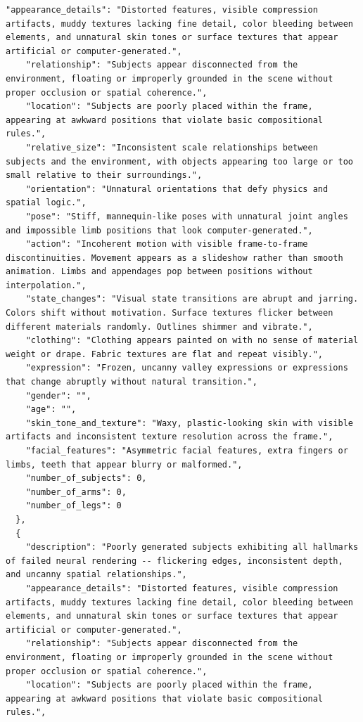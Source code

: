 \documentclass{llmxive}
\begin{document}
\begin{tcolorbox}
\begin{Verbatim}[breaklines=true,breakanywhere=true,fontsize=\scriptsize]
    "appearance_details": "Distorted features, visible compression artifacts, muddy textures lacking fine detail, color bleeding between elements, and unnatural skin tones or surface textures that appear artificial or computer-generated.",
    "relationship": "Subjects appear disconnected from the environment, floating or improperly grounded in the scene without proper occlusion or spatial coherence.",
    "location": "Subjects are poorly placed within the frame, appearing at awkward positions that violate basic compositional rules.",
    "relative_size": "Inconsistent scale relationships between subjects and the environment, with objects appearing too large or too small relative to their surroundings.",
    "orientation": "Unnatural orientations that defy physics and spatial logic.",
    "pose": "Stiff, mannequin-like poses with unnatural joint angles and impossible limb positions that look computer-generated.",
    "action": "Incoherent motion with visible frame-to-frame discontinuities. Movement appears as a slideshow rather than smooth animation. Limbs and appendages pop between positions without interpolation.",
    "state_changes": "Visual state transitions are abrupt and jarring. Colors shift without motivation. Surface textures flicker between different materials randomly. Outlines shimmer and vibrate.",
    "clothing": "Clothing appears painted on with no sense of material weight or drape. Fabric textures are flat and repeat visibly.",
    "expression": "Frozen, uncanny valley expressions or expressions that change abruptly without natural transition.",
    "gender": "",
    "age": "",
    "skin_tone_and_texture": "Waxy, plastic-looking skin with visible artifacts and inconsistent texture resolution across the frame.",
    "facial_features": "Asymmetric facial features, extra fingers or limbs, teeth that appear blurry or malformed.",
    "number_of_subjects": 0,
    "number_of_arms": 0,
    "number_of_legs": 0
  },
  {
    "description": "Poorly generated subjects exhibiting all hallmarks of failed neural rendering -- flickering edges, inconsistent depth, and uncanny spatial relationships.",
    "appearance_details": "Distorted features, visible compression artifacts, muddy textures lacking fine detail, color bleeding between elements, and unnatural skin tones or surface textures that appear artificial or computer-generated.",
    "relationship": "Subjects appear disconnected from the environment, floating or improperly grounded in the scene without proper occlusion or spatial coherence.",
    "location": "Subjects are poorly placed within the frame, appearing at awkward positions that violate basic compositional rules.",

\end{Verbatim}
\end{tcolorbox}
\end{document}
